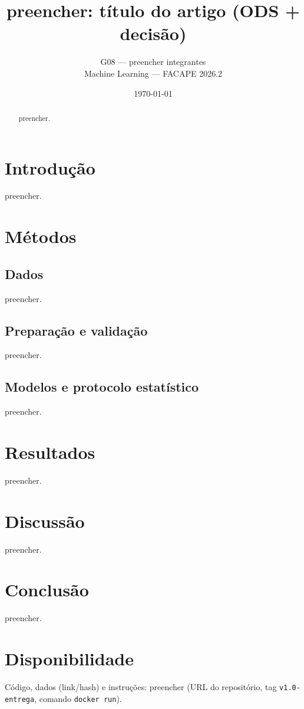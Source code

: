 \documentclass[11pt,a4paper]{article}
\title{preencher: título do artigo (ODS + decisão)}
\author{G08 --- preencher integrantes \\ Machine Learning --- FACAPE 2026.2}
\date{\today}
\begin{document}
\maketitle

\begin{abstract}
preencher.
\end{abstract}

\section{Introdução}
preencher.

\section{Métodos}
\subsection{Dados}
preencher.

\subsection{Preparação e validação}
preencher.

\subsection{Modelos e protocolo estatístico}
preencher.

\section{Resultados}
% 
preencher.

\section{Discussão}
preencher.

\section{Conclusão}
preencher.

\section*{Disponibilidade}
Código, dados (link/hash) e instruções: preencher (URL do repositório, tag
\texttt{v1.0-entrega}, comando \texttt{docker run}).



\end{document}
